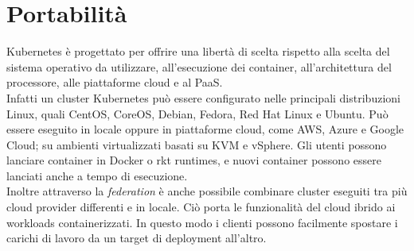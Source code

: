 \documentclass[12pt, a4paper]{report}
\begin{document}
\section{Portabilità}
Kubernetes è progettato per offrire una libertà di scelta rispetto alla scelta del sistema operativo da utilizzare, all'esecuzione dei container, all'architettura del processore, alle piattaforme cloud e al PaaS.\\
Infatti un cluster Kubernetes può essere configurato nelle principali distribuzioni Linux, quali CentOS, CoreOS, Debian, Fedora, Red Hat Linux e Ubuntu. Può essere eseguito in locale oppure in piattaforme cloud, come AWS, Azure e Google Cloud; su ambienti virtualizzati basati su KVM e vSphere. Gli utenti possono lanciare container in Docker o rkt runtimes, e nuovi container possono essere lanciati anche a tempo di esecuzione. \\
Inoltre attraverso la \textit{federation} è anche possibile combinare cluster eseguiti tra più cloud provider differenti e in locale. Ciò porta le funzionalità del cloud ibrido ai workloads containerizzati. In questo modo i clienti possono facilmente spostare i carichi di lavoro da un target di deployment all'altro.
\end{document}
